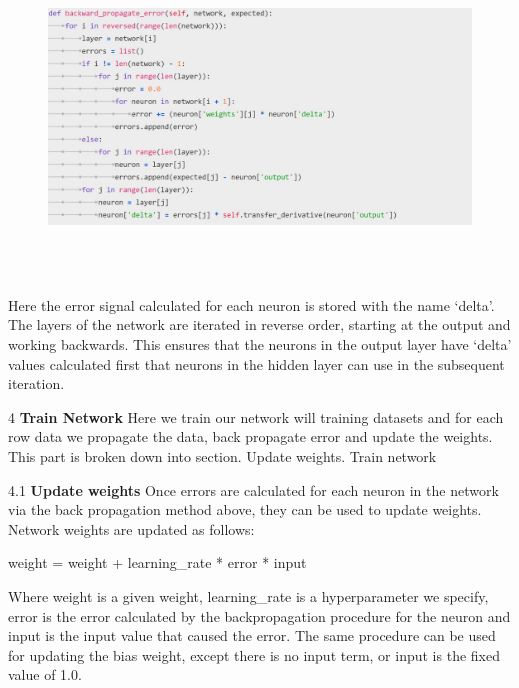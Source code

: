 { \begin{figure}[H]
\begin{center}
\includegraphics[width=160mm,height=85mm]{backexplain/errorback.jpg}
\end{center}
\end{figure} 

Here the error signal calculated for each neuron is stored with the name ‘delta’. The layers of the network are iterated in reverse order, starting at the output and working backwards. This ensures that the neurons in the output layer have ‘delta’ values calculated first that neurons in the hidden layer can use in the subsequent iteration.


4 \textbf{Train Network}
Here we train our network will training datasets and for each row data we propagate the data, back propagate error and update the weights.
 This part is broken down into section. Update weights. Train network


4.1 \textbf{Update weights}
Once errors are calculated for each neuron in the network via the back propagation method above, they can be used to update weights.\newline
Network weights are updated as follows:\newline
\centerline{weight = weight + learning\_rate * error * input}
Where weight is a given weight, learning\_rate is a hyperparameter we specify, error is the error calculated by the backpropagation procedure for the neuron and input is the input value that caused the error.
The same procedure can be used for updating the bias weight, except there is no input term, or input is the fixed value of 1.0.

}

